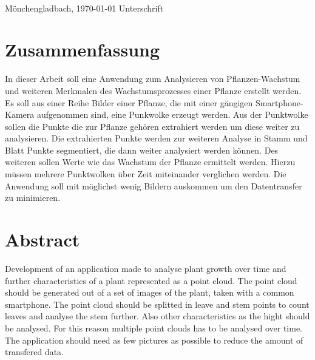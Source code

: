 \documentclass[12pt,titlepage, twoside]{article}
\begin{document}
\vspace{8ex}
\begin{tabbing}
\underline{\hspace{14em}} \hspace{3em}\= \underline{\hspace{14em}} \\
Mönchengladbach, \today \> Unterschrift
\end{tabbing}

\newpage
\section*{Zusammenfassung}
In dieser Arbeit soll eine Anwendung zum Analysieren von Pflanzen-Wachstum und weiteren Merkmalen des Wachstumsprozesses einer Pflanze erstellt werden. Es soll aus einer Reihe Bilder einer Pflanze, die mit einer gängigen Smartphone-Kamera aufgenommen sind, eine Punkwolke erzeugt werden. 
Aus der Punktwolke sollen die Punkte die zur Pflanze gehören extrahiert werden um diese weiter zu analysieren. Die extrahierten Punkte werden zur weiteren Analyse in Stamm und Blatt Punkte segmentiert, die dann weiter analysiert werden können.
Des weiteren sollen Werte wie das Wachstum der Pflanze ermittelt werden. Hierzu müssen mehrere Punktwolken über Zeit miteinander verglichen werden.
Die Anwendung soll mit möglichst wenig Bildern auskommen um den Datentransfer zu minimieren.

\setcounter{page}{1}
\section*{Abstract}
Development of an application made to analyse plant growth over time and further characteristics of a plant represented as a point cloud. The point cloud should be generated out of a set of images of the plant, taken with a common smartphone.
The point cloud should be splitted in leave and stem points to count leaves and analyse the stem further. Also other characteristics as the hight should be analysed. For this reason multiple point clouds has to be analysed over time.
The application should need as few pictures as possible to reduce the amount of transfered data.
\end{document}
